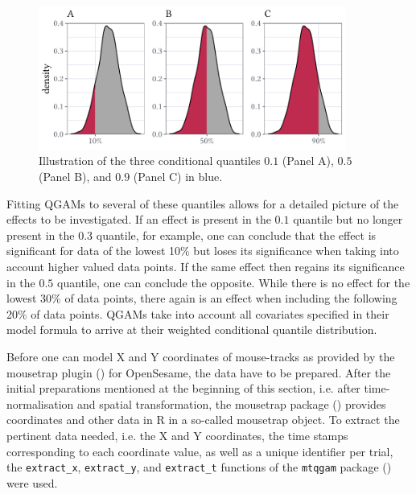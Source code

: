 \begin{figure}
    \centering
    \includegraphics[width=0.9\textwidth]{figures/fig7.9.pdf}
    \caption{Illustration of the three conditional quantiles $0.1$ (Panel A), $0.5$ (Panel B), and $0.9$ (Panel C) in blue.}
    \label{fig:7_9}
\end{figure}

Fitting QGAMs to several of these quantiles allows for a detailed picture of the effects to be investigated. If an effect is present in the $0.1$ quantile but no longer present in the $0.3$ quantile, for example, one can conclude that the effect is significant for data of the lowest 10\% but loses its significance when taking into account higher valued data points. If the same effect then regains its significance in the $0.5$ quantile, one can conclude the opposite. While there is no effect for the lowest 30\% of data points, there again is an effect when including the following 20\% of data points. QGAMs take into account all covariates specified in their model formula to arrive at their weighted conditional quantile distribution. 

Before one can model X and Y coordinates of mouse-tracks as provided by the mousetrap plugin (\cite{Kieslich2017}) for OpenSesame, the data have to be prepared. After the initial preparations mentioned at the beginning of this section, i.e. after time-normalisation and spatial transformation, the mousetrap package (\cite{Kieslich2019}) provides coordinates and other data in R in a so-called mousetrap object. To extract the pertinent data needed, i.e. the X and Y coordinates, the time stamps corresponding to each coordinate value, as well as a unique identifier per trial, the \texttt{extract\_x}, \texttt{extract\_y}, and \texttt{extract\_t} functions of the \texttt{mtqgam} package (\cite{Schmitz2021mtqgam}) were used. 

